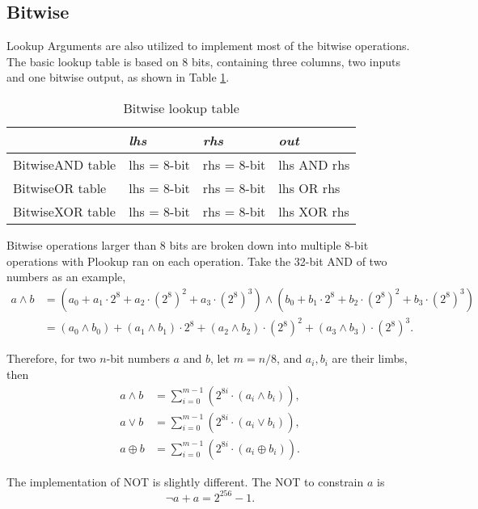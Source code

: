 \subsection{Bitwise}

Lookup Arguments are also utilized to implement most of the bitwise operations. The basic lookup table is based on 8 bits, containing three columns, two inputs and one bitwise output, as shown in Table \ref{table:bitwise-lookup}.

\begin{table}[!ht]
    \centering
    \begin{tabular}{|l|l|l|l|}
    \hline
        & \emph{lhs} & \emph{rhs} & \emph{out} \\ \hline
        BitwiseAND table & lhs = 8-bit & rhs = 8-bit & lhs AND rhs \\ \hline
        BitwiseOR table & lhs = 8-bit & rhs = 8-bit & lhs OR rhs \\ \hline
        BitwiseXOR table & lhs = 8-bit & rhs = 8-bit & lhs XOR rhs \\ \hline
    \end{tabular}
    \caption{Bitwise lookup table}
    \label{table:bitwise-lookup}
\end{table}

Bitwise operations larger than 8 bits are broken down into multiple 8-bit operations with Plookup ran on each operation. Take the 32-bit AND of two numbers as an example,
\begin{align*}
a \land b &= (a_0 + a_1\cdot2^8 + a_2 \cdot (2^8)^2 + a_3\cdot(2^8)^3) \land (b_0 + b_1\cdot2^8 + b_2 \cdot (2^8)^2 + b_3\cdot(2^8)^3)\\ &= (a_0 \land b_0) + (a_1 \land b_1)\cdot2^8 + (a_2 \land b_2)\cdot(2^8)^2+(a_3 \land b_3)\cdot(2^8)^3.
\end{align*}

Therefore, for two $n$-bit numbers $a$ and $b$, let $m=n/8$, and $a_i,b_i$ are their limbs, then
\begin{align*}
a \land b &= \sum_{i=0}^{m-1} (2^{8i} \cdot (a_i \land b_i)), \\
a \lor b &= \sum_{i=0}^{m-1} (2^{8i} \cdot (a_i \lor b_i)), \\
a \oplus b &= \sum_{i=0}^{m-1} (2^{8i} \cdot (a_i \oplus b_i)).
\end{align*}

The implementation of NOT is slightly different. The NOT to constrain $a$ is
\[ \neg a + a = 2^{256} - 1. \]
